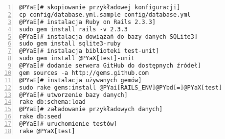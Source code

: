\begin{Verbatim}[commandchars=@\[\],numbers=left,firstnumber=1,stepnumber=1]
@PYaE[# skopiowanie przykładowej konfiguracji]
cp config/database.yml.sample config/database.yml
@PYaE[# instalacja Ruby on Rails 2.3.3]
sudo gem install rails -v 2.3.3
@PYaE[# instalacja dowiązań do bazy danych SQLite3]
sudo gem install sqlite3-ruby
@PYaE[# instalacja biblioteki test-unit]
sudo gem install @PYaX[test]-unit
@PYaE[# dodanie serwera GitHub do dostępnych źródeł]
gem sources -a http://gems.github.com
@PYaE[# instalacja używanych gemów]
sudo rake gems:install @PYai[RAILS_ENV]@PYbd[=]@PYaX[test]
@PYaE[# utworzenie bazy danych]
rake db:schema:load
@PYaE[# załadowanie przykładowych danych]
rake db:seed
@PYaE[# uruchomienie testów]
rake @PYaX[test]
\end{Verbatim}
